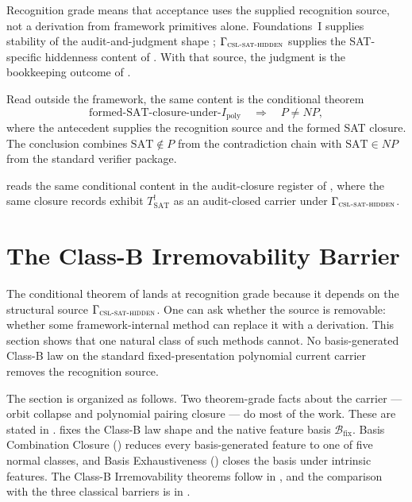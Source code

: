 \documentclass[11pt]{article}
\newcommand{\Tsat}{T^{!}_{\mathrm{SAT}}}
\newcommand{\Ipoly}{I_{\mathrm{poly}}}
\newcommand{\CSLSATHidden}{\Gamma_{\textsc{csl-sat-hidden}}}
\theoremstyle{definition}
\begin{document}
Recognition grade means that acceptance uses the supplied recognition
source, not a derivation from framework primitives alone.  Foundations~I
supplies stability of the audit-and-judgment shape
\citep{TsiokosFoundationsI2026}; \(\CSLSATHidden\) supplies the
SAT-specific hiddenness content of \citet{TsiokosHiddenness2026}.  With
that source, the judgment is the bookkeeping outcome of
.

Read outside the framework, the same content is the conditional
theorem
\[
  \text{formed-SAT-closure-under-\(\Ipoly\)}
  \quad\Longrightarrow\quad
  P\neq NP,
\]
where the antecedent supplies the recognition source and the formed
SAT closure.  The conclusion combines \(\mathrm{SAT}\notin P\) from
the contradiction chain with \(\mathrm{SAT}\in NP\) from the standard
verifier package.

 reads the same conditional content in the
audit-closure register of \citet{Tsiokos2026AOR}, where the same
closure records exhibit \(\Tsat\) as an audit-closed carrier under
\(\CSLSATHidden\).
 

\section{The Class-B Irremovability Barrier}
\label{sec:class-b-barrier}

The conditional theorem of  lands at
recognition grade because it depends on the structural source
\(\CSLSATHidden\).  One can ask whether the source is removable: whether
some framework-internal method can replace it with a derivation.  This
section shows that one natural class of such methods cannot.  No
basis-generated Class-B law on the standard fixed-presentation
polynomial current carrier removes the recognition source.

The section is organized as follows.  Two theorem-grade facts about the
carrier — orbit collapse and polynomial pairing closure — do most of
the work.  These are stated in .
 fixes the Class-B law shape and
the native feature basis \(\mathcal B_{\mathrm{fix}}\).  Basis
Combination Closure () reduces
every basis-generated feature to one of five normal classes, and Basis
Exhaustiveness () closes the
basis under intrinsic features.  The Class-B Irremovability theorems
follow in , and the comparison
with the three classical barriers is in
.
\end{document}
